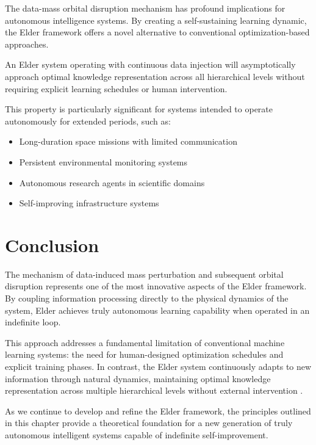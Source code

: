 The data-mass orbital disruption mechanism has profound implications for autonomous intelligence systems. By creating a self-sustaining learning dynamic, the Elder framework offers a novel alternative to conventional optimization-based approaches.

\begin{theorem}
An Elder system operating with continuous data injection will asymptotically approach optimal knowledge representation across all hierarchical levels without requiring explicit learning schedules or human intervention.
\end{theorem}

This property is particularly significant for systems intended to operate autonomously for extended periods, such as:

\begin{itemize}
    \item Long-duration space missions with limited communication
    \item Persistent environmental monitoring systems
    \item Autonomous research agents in scientific domains
    \item Self-improving infrastructure systems
\end{itemize}

\section{Conclusion}

The mechanism of data-induced mass perturbation and subsequent orbital disruption represents one of the most innovative aspects of the Elder framework. By coupling information processing directly to the physical dynamics of the system, Elder achieves truly autonomous learning capability when operated in an indefinite loop.

This approach addresses a fundamental limitation of conventional machine learning systems: the need for human-designed optimization schedules and explicit training phases. In contrast, the Elder system continuously adapts to new information through natural dynamics, maintaining optimal knowledge representation across multiple hierarchical levels without external intervention \cite{autonomous_learning_systems}.

As we continue to develop and refine the Elder framework, the principles outlined in this chapter provide a theoretical foundation for a new generation of truly autonomous intelligent systems capable of indefinite self-improvement.

